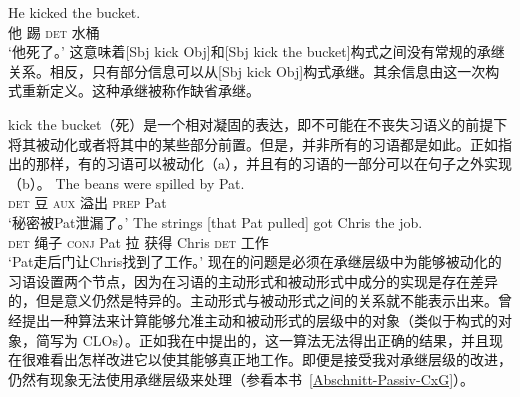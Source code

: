 \begin{exe}
\begin{xlist}[iv.]
\begin{exe}
\begin{xlist}[iv.]
\ea
\gll He kicked the bucket.\\
     他 踢 \textsc{det} 水桶\\
\glt `他死了。'
\z
这意味着[Sbj kick Obj]和[Sbj kick the bucket]构式之间没有常规的承继关系。相反，只有部分信息可以从[Sbj kick Obj]构式承继。其余信息由这一次构式重新定义。这种承继被称作缺省承继。

kick the bucket（死）是一个相对凝固的表达，即不可能在不丧失习语义的前提下将其被动化或者将其中的某些部分前置\citep*[]{NSW94a}。但是，并非所有的习语都是如此。正如\citet*[]{NSW94a}指出的那样，有的习语可以被动化（a），并且有的习语的一部分可以在句子之外实现（b）。
\eal
\ex 
\gll The beans were spilled by Pat.\\
     \textsc{det} 豆 \textsc{aux} 溢出 \textsc{prep} Pat\\
\glt `秘密被Pat泄漏了。'
\ex 
\gll The strings [that Pat pulled] got Chris the job.\\
     \textsc{det} 绳子 \spacebr{}\textsc{conj} Pat 拉 获得 Chris \textsc{det} 工作\\
\glt `Pat走后门让Chris找到了工作。'
\zl
%
%
现在的问题是必须在承继层级中为能够被动化的习语设置两个节点，因为在习语的主动形式和被动形式中成分的实现是存在差异的，但是意义仍然是特异的。主动形式与被动形式之间的关系就不能表示出来。\citet{Kay2002a}曾经提出一种算法来计算能够允准主动和被动形式的层级中的对象（类似于构式的对象，简写为 CLOs）。正如我在\citet[\S~3]{Mueller2006d}中提出的，这一算法无法得出正确的结果，并且现在很难看出怎样改进它以使其能够真正地工作。即便是接受我对承继层级的改进，仍然有现象无法使用承继层级来处理（参看本书~\ref{Abschnitt-Passiv-CxG}）。

\end{xlist}
\end{exe}
\end{xlist}
\end{exe}

